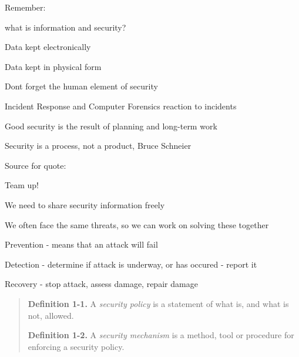 \documentclass[Screen16to9,17pt]{foils}
\begin{document}

\begin{list1}
\item Remember:
\begin{list2}
\item what is information and security?
\item Data kept electronically
\item Data kept in physical form
\item Dont forget the human element of security
\end{list2}
\item Incident Response and Computer Forensics reaction to incidents
\item Good security is the result of planning and long-term work
\end{list1}
\vskip 1cm
\centerline{\color{titlecolor}\LARGE Security is a process, not a product, Bruce Schneier}

Source for quote: 




\begin{list1}
\item Team up!
\item We need to share security information freely
\item We often face the same threats, so we can work on solving these together
\end{list1}


\begin{list1}
\item Prevention - means that an attack will fail
\item Detection - determine if attack is underway, or has occured - report it
\item Recovery - stop attack, assess damage, repair damage
\end{list1}


\begin{quote}
{\bf Definition 1-1.} A \emph{security policy} is a statement of what is, and what is not, allowed.

{\bf Definition 1-2.} A \emph{security mechanism} is a method, tool or procedure for enforcing a security policy.
\end{quote}
\end{document}
